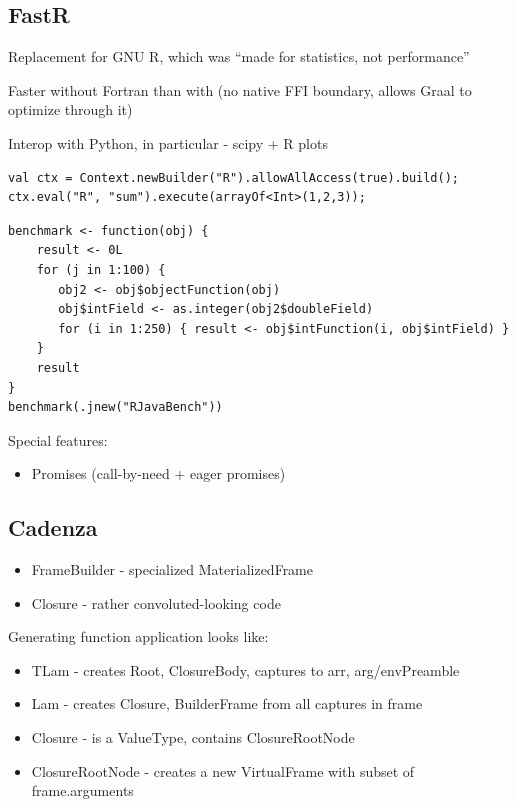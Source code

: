 \documentclass[english,zadani,odsaz]{fitthesis}
\begin{document}
\subsection{FastR}
\label{sec:orgb5af711}
Replacement for GNU R, which was ``made for statistics, not performance''

Faster without Fortran than with (no native FFI boundary, allows Graal to
optimize through it)

Interop with Python, in particular - scipy + R plots

\begin{verbatim}
val ctx = Context.newBuilder("R").allowAllAccess(true).build();
ctx.eval("R", "sum").execute(arrayOf<Int>(1,2,3));
\end{verbatim}

\begin{verbatim}
benchmark <- function(obj) {
    result <- 0L
    for (j in 1:100) {
       obj2 <- obj$objectFunction(obj)
       obj$intField <- as.integer(obj2$doubleField)
       for (i in 1:250) { result <- obj$intFunction(i, obj$intField) }
    }
    result
}
benchmark(.jnew("RJavaBench"))
\end{verbatim}

Special features:
\begin{itemize}
\item Promises (call-by-need + eager promises)
\end{itemize}

\subsection{Cadenza}
\label{sec:org75211c7}

\begin{itemize}
\item FrameBuilder - specialized MaterializedFrame
\item Closure - rather convoluted-looking code
\end{itemize}

Generating function application looks like:
\begin{itemize}
\item TLam - creates Root, ClosureBody, captures to arr, arg/envPreamble
\item Lam - creates Closure, BuilderFrame from all captures in frame
\item Closure - is a ValueType, contains ClosureRootNode
\item ClosureRootNode - creates a new VirtualFrame with subset of frame.arguments
\end{itemize}
\end{document}
